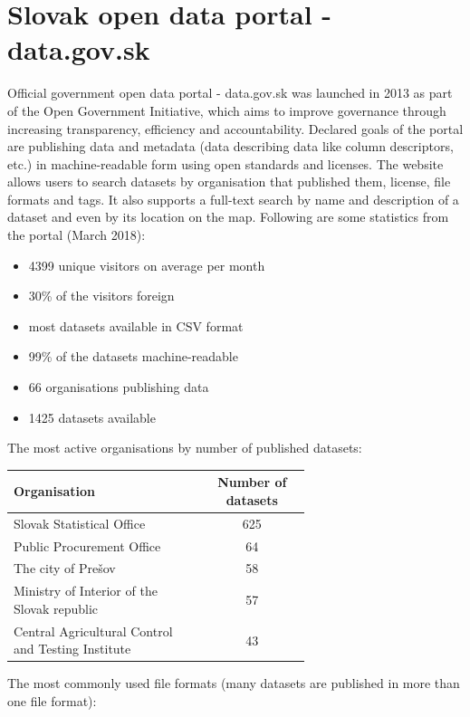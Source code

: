 \documentclass[thesis=B,english]{FITthesis}[2012/06/26]
\begin{document}
	\section{Slovak open data portal - data.gov.sk}
	Official government open data portal - data.gov.sk was launched in 2013 as part of the Open Government Initiative, which aims to improve governance through increasing transparency, efficiency and accountability. Declared goals of the portal are publishing data and metadata (data describing data like column descriptors, etc.) in machine-readable form using open standards and licenses. The website allows users to search datasets by organisation that published them, license, file formats and tags. It also supports a full-text search by name and description of a dataset and even by its location on the map.
	Following are some statistics from the portal (March 2018):
	\begin{itemize}
		\item 4399 unique visitors on average per month
		\item 30\% of the visitors foreign 
		\item most datasets available in CSV format
		\item  99\% of the datasets machine-readable
		\item 66 organisations publishing data
		\item 1425 datasets available
	\end{itemize}
	The most active organisations by number of published datasets:
	\begin{center}
	\label{toporganisations}
        \begin{tabular}{  p{0.65\linewidth} | c }
        \textbf{Organisation} & \textbf{Number of datasets} \\ \hline
        Slovak Statistical Office & 625 \\
        Public Procurement Office & 64 \\
        The city of Prešov & 58 \\
        Ministry of Interior of the Slovak republic & 57 \\
        Central Agricultural Control and Testing Institute & 43 \\
        \end{tabular}
    \end{center}
    \vspace{20px}
    The most commonly used file formats (many datasets are published in more than one file format):
\end{document}
